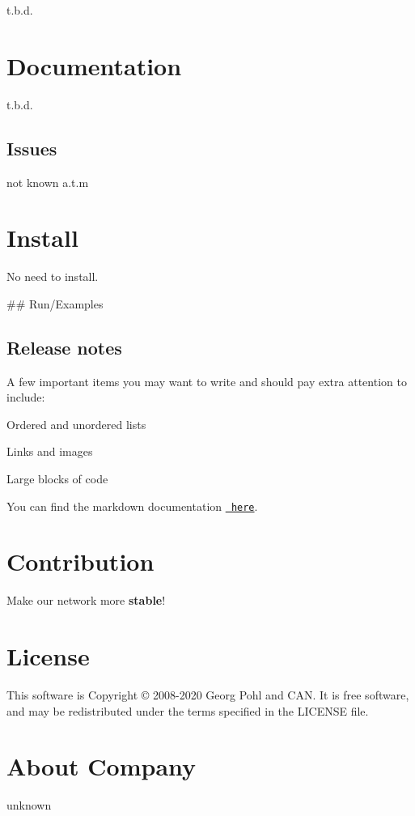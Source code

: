 t.\+b.\+d.

\section*{Documentation}

t.\+b.\+d.

\subsection*{Issues}

not known a.\+t.\+m

\section*{Install}

No need to {\ttfamily install}.

\#\# Run/\+Examples 
\begin{DoxyCode}{0}
\end{DoxyCode}


\subsection*{Release notes}

A few important items you may want to write and should pay extra attention to include\+:


\begin{DoxyItemize}
\item Ordered and unordered lists
\item Links and images
\item Large blocks of code
\end{DoxyItemize}

You can find the markdown documentation \href{https://docs.github.com/en/free-pro-team@latest/github/writing-on-github}{\texttt{ here}}.

\section*{Contribution}

Make our network more {\bfseries{stable}}!

\section*{License}

This software is Copyright © 2008-\/2020 Georg Pohl and C\+AN. It is free software, and may be redistributed under the terms specified in the L\+I\+C\+E\+N\+SE file.

\section*{About \textquotesingle{}Company\textquotesingle{}}

unknown 